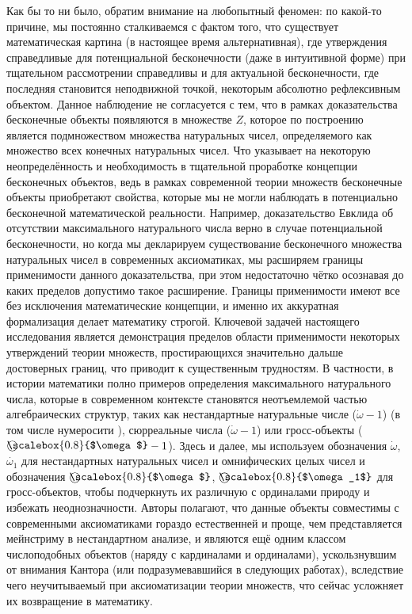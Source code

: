 \documentclass[12pt]{article}
\begin{document}
Как бы то ни было, обратим внимание на любопытный феномен: по какой-то причине, мы постоянно сталкиваемся с фактом того, что существует математическая картина (в настоящее время альтернативная), где утверждения справедливые для потенциальной бесконечности (даже в интуитивной форме) при тщательном рассмотрении справедливы и для актуальной бесконечности, где последняя становится неподвижной точкой, некоторым абсолютно рефлексивным объектом. Данное наблюдение не согласуется с тем, что в рамках доказательства бесконечные объекты появляются в множестве $Z$, которое по построению является подмножеством множества натуральных чисел, определяемого как множество всех конечных натуральных чисел. Что указывает на некоторую неопределённость и необходимость в тщательной проработке концепции бесконечных объектов, ведь в рамках современной теории множеств бесконечные объекты приобретают свойства, которые мы не могли наблюдать в потенциально бесконечной математической реальности. Например, доказательство Евклида об отсутствии максимального натурального числа верно в случае потенциальной бесконечности, но когда мы декларируем существование бесконечного множества натуральных чисел в современных аксиоматиках, мы расширяем границы применимости данного доказательства, при этом недостаточно чётко осознавая до каких пределов допустимо такое расширение. Границы применимости имеют все без исключения математические концепции, и именно их аккуратная формализация делает математику строгой. Ключевой задачей настоящего исследования является демонстрация пределов области применимости некоторых утверждений теории множеств, простирающихся значительно дальше достоверных границ, что приводит к существенным трудностям. В частности, в истории математики полно примеров определения максимального натурального числа, которые в современном контексте становятся неотъемлемой частью алгебраических структур, таких как нестандартные натуральные числе \cite{infinitesimal-nonstandard-numbers} ($\dot{\omega} - 1$) (в том числе нумеросити \cite{numerosities}), сюрреальные числа \cite{conway-surreal-numbers} ($\dot{\omega} - 1$) или гросс-объекты \cite{grossone} ($\raisebox{.5pt}{\textcircled{\scalebox{0.8}{$\omega$}}} - 1$). Здесь и далее, мы используем обозначения $\dot{\omega}$, $\dot{\omega_1}$ для нестандартных натуральных чисел и омнифических целых чисел и обозначения $\raisebox{.5pt}{\textcircled{\scalebox{0.8}{$\omega$}}}$, $\raisebox{.5pt}{\textcircled{\scalebox{0.8}{$\omega_1$}}}$ для гросс-объектов, чтобы подчеркнуть их различную с ординалами природу и избежать неоднозначности. Авторы полагают, что данные объекты совместимы с современными аксиоматиками гораздо естественней и проще, чем представляется мейнстриму в нестандартном анализе, и являются ещё одним классом числоподобных объектов (наряду с кардиналами и ординалами), ускользнувшим от внимания Кантора (или подразумевавшийся в следующих работах), вследствие чего неучитываемый при аксиоматизации теории множеств, что сейчас усложняет их возвращение в математику.
\end{document}
